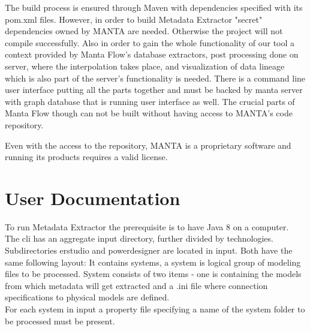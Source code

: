 \documentclass[12pt,a4paper]{report}
\begin{document}
The build process is ensured through Maven with dependencies specified with its pom.xml files.
However, in order to build Metadata Extractor "secret" dependencies owned by MANTA are needed. Otherwise the project will not compile successfully. 
Also in order to gain the whole functionality of our tool a context provided by Manta Flow's database extractors, post processing done on server, where the interpolation takes place, and visualization of data lineage which is also part of the server's functionality is needed. 
There is a command line user interface putting all the parts together and must be backed by manta server with graph database that is running user interface as well. The crucial parts of Manta Flow though can not be built without having access to MANTA's code repository.

Even with the access to the repository, MANTA is a proprietary software and running its products requires a valid license.



\section{User Documentation}


To run Metadata Extractor the prerequisite is to have Java 8 on a computer. \\

The cli has an aggregate input directory, further divided by technologies.
Subdirectories erstudio and powerdesigner are located in input.  
Both have the same following layout: 
It contains systems, a system is logical group of modeling files to be processed.
System consists of two items - one is containing the models from which metadata will get extracted and a .ini file where connection specifications to physical models are defined.   \\

For each system in input a property file specifying a name of the system folder to be processed must be present. \\ 
\end{document}
